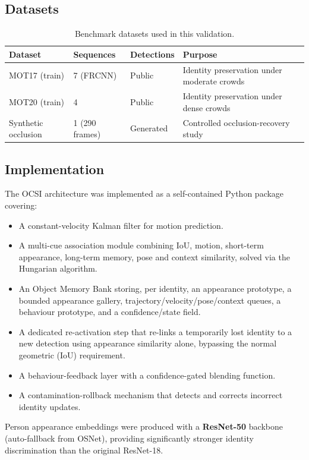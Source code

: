 \documentclass[11pt,a4paper]{article}
\begin{document}
\subsection{Datasets}
\begin{table}[H]
\centering
\caption{Benchmark datasets used in this validation.}
\label{tab:datasets}
\begin{tabular}{@{}llll@{}}
\toprule
\textbf{Dataset} & \textbf{Sequences} & \textbf{Detections} & \textbf{Purpose} \\
\midrule
MOT17 (train) & 7 (FRCNN) & Public & Identity preservation under moderate crowds \\
MOT20 (train) & 4 & Public & Identity preservation under dense crowds \\
Synthetic occlusion & 1 (290 frames) & Generated & Controlled occlusion-recovery study \\
\bottomrule
\end{tabular}
\end{table}

\subsection{Implementation}
The OCSI architecture was implemented as a self-contained Python package covering:
\begin{itemize}[leftmargin=2em]
    \item A constant-velocity Kalman filter for motion prediction.
    \item A multi-cue association module combining IoU, motion, short-term appearance, long-term memory, pose and context similarity, solved via the Hungarian algorithm.
    \item An Object Memory Bank storing, per identity, an appearance prototype, a bounded appearance gallery, trajectory/velocity/pose/context queues, a behaviour prototype, and a confidence/state field.
    \item A dedicated re-activation step that re-links a temporarily lost identity to a new detection using appearance similarity alone, bypassing the normal geometric (IoU) requirement.
    \item A behaviour-feedback layer with a confidence-gated blending function.
    \item A contamination-rollback mechanism that detects and corrects incorrect identity updates.
\end{itemize}

Person appearance embeddings were produced with a \textbf{ResNet-50} backbone (auto-fallback from OSNet), providing significantly stronger identity discrimination than the original ResNet-18.
\end{document}
